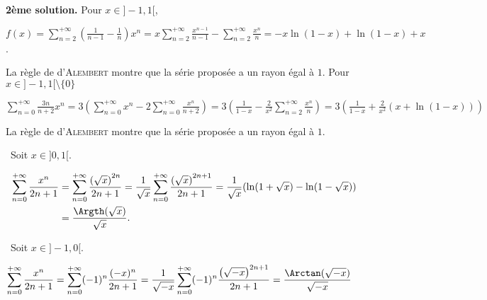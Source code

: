 {{\textbf{2ème solution.} Pour $x\in]-1,1[$, 

\begin{center}
$f(x) =\sum_{n=2}^{+\infty}\left(\frac{1}{n-1}-\frac{1}{n}\right)x^n =x\sum_{n=2}^{+\infty}\frac{x^{n-1}}{n-1}-\sum_{n=2}^{+\infty}\frac{x^n}{n}=-x\ln(1-x) +\ln(1-x) + x$.
\end{center}

\begin{center}
\shadowbox{
$\forall x\in]-1,1[$, $\sum_{n=2}^{+\infty}\frac{x^n}{n(n-1)}=-x\ln(1-x) +\ln(1-x) + x$.
}
\end{center}
La règle de d'\textsc{Alembert} montre que la série proposée a un rayon égal à $1$.
Pour $x\in]-1,1[\setminus\{0\}$

\begin{center}
$\sum_{n=0}^{+\infty}\frac{3n}{n+2}x^n =3\left(\sum_{n=0}^{+\infty}x^n - 2\sum_{n=0}^{+\infty}\frac{x^n}{n+2}\right) = 3\left(\frac{1}{1-x}- \frac{2}{x^2}\sum_{n=2}^{+\infty}\frac{x^n}{n}\right) = 3\left(\frac{1}{1-x}+\frac{2}{x^2}(x+\ln(1-x))\right)$
\end{center}

\begin{center}
\shadowbox{
$\forall x\in]-1,1[$, $\sum_{n=0}^{+\infty}\frac{3n}{n+2}x^n=\left\{
\begin{array}{l}3\left(\frac{1}{1-x}+\frac{2}{x^2}(x+\ln(1-x))\right)\;\text{si}\;x\in]-1,1[\setminus\{0\}\\
\rule{0mm}{4mm}0\;\text{si}\;x=0
\end{array}
\right.$.
}
\end{center}
La règle de d'\textsc{Alembert} montre que la série proposée a un rayon égal à $1$.

\textbullet~Soit $x\in]0,1[$.

\begin{align*}\ensuremath
\sum_{n=0}^{+\infty}\frac{x^n}{2n+1}&=\sum_{n=0}^{+\infty}\frac{\left(\sqrt{x}\right)^{2n}}{2n+1}=\frac{1}{\sqrt{x}}\sum_{n=0}^{+\infty}\frac{\left(\sqrt{x}\right)^{2n+1}}{2n+1}=\frac{1}{\sqrt{x}}(\ln(1+\sqrt{x}) -\ln(1-\sqrt{x}))\\
 &=\frac{\Argth(\sqrt{x})}{\sqrt{x}}.
\end{align*}	

\textbullet~Soit $x\in]-1,0[$.

\begin{align*}\ensuremath
\sum_{n=0}^{+\infty}\frac{x^n}{2n+1}&=\sum_{n=0}^{+\infty}(-1)^n\frac{(-x)^n}{2n+1}=\frac{1}{\sqrt{-x}}\sum_{n=0}^{+\infty}(-1)^n\frac{\left(\sqrt{-x}\right)^{2n+1}}{2n+1}=\frac{\Arctan(\sqrt{-x})}{\sqrt{-x}}
\end{align*}

}}
